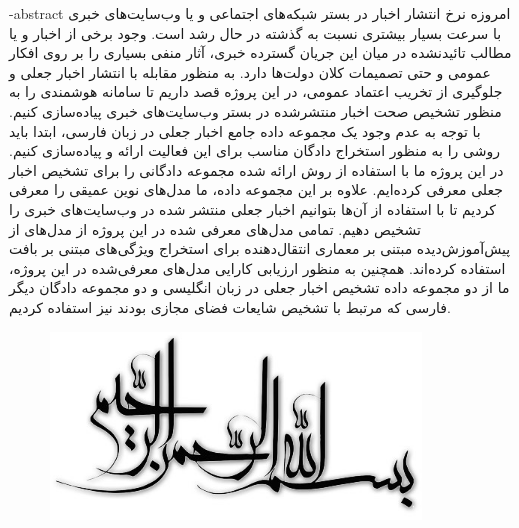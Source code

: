 
\fa-abstract{
امروزه نرخ انتشار اخبار در بستر شبکه‌های اجتماعی و یا وب‌سایت‌های خبری با سرعت بسیار بیشتری نسبت به گذشته در حال رشد است. وجود برخی از اخبار و یا مطالب تائیدنشده در میان این جریان گسترده خبری، آثار منفی بسیاری را بر روی افکار عمومی و حتی تصمیمات کلان دولت‌ها دارد. به منظور مقابله با انتشار اخبار جعلی و جلوگیری از تخریب اعتماد عمومی، در این پروژه قصد داریم تا سامانه‌ هوشمندی را به منظور تشخیص صحت اخبار منتشرشده  در بستر وب‌سایت‌های خبری پیاده‌سازی کنیم. با توجه به عدم وجود یک مجموعه داده جامع اخبار جعلی در زبان فارسی، ابتدا باید روشی را به منظور استخراج دادگان مناسب برای این فعالیت ارائه و پیاده‌سازی کنیم. در این پروژه ما با استفاده از روش ارائه شده مجموعه دادگانی را برای تشخیص اخبار جعلی معرفی کرده‌ایم. علاوه بر این مجموعه داده، ما مدل‌های نوین عمیقی را معرفی کردیم تا با استفاده از آن‌ها بتوانیم اخبار جعلی منتشر شده در وب‌سایت‌های خبری را تشخیص دهیم. تمامی مدل‌های معرفی شده در این پروژه از مدل‌های از پیش‌آموزش‌دیده مبتنی بر معماری انتقال‌دهنده‌ برای استخراج ویژگی‌های مبتنی بر بافت استفاده کرده‌اند. همچنین به منظور ارزیابی کارایی مدل‌های معرفی‌شده در این پروژه، ما از دو مجموعه داده تشخیص اخبار جعلی در زبان انگلیسی و دو مجموعه دادگان دیگر فارسی که مرتبط با تشخیص شایعات فضای مجازی بودند نیز استفاده کردیم.
}





\AUTtitle
\vspace*{7cm}
\thispagestyle{empty}
\begin{center}
\includegraphics[height=5cm,width=12cm]{besm}
\end{center}